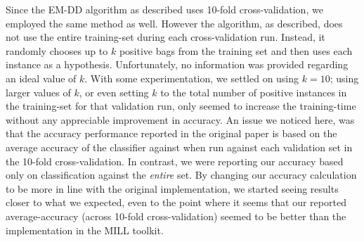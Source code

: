 \documentclass[conference]{IEEEtran}
\begin{document}
Since the EM-DD algorithm as described uses 10-fold cross-validation, we employed the same method as well. However the algorithm, as described, does not use the entire training-set during each cross-validation run. Instead, it randomly chooses up to $k$ positive bags from the training set and then uses each instance as a hypothesis. Unfortunately, no information was provided regarding an ideal value of $k$. With some experimentation, we settled on using $k = 10$; using larger values of $k$, or even setting $k$ to the total number of positive instances in the training-set for that validation run, only seemed to increase the training-time without any appreciable improvement in accuracy. An issue we noticed here, was that the accuracy performance reported in the original paper is based on the average accuracy of the classifier against when run against each validation set in the 10-fold cross-validation. In contrast, we were reporting our accuracy based only on classification against the \textit{entire} set. By changing our accuracy calculation to be more in line with the original implementation, we started seeing results closer to what we expected, even to the point where it seems that our reported average-accuracy (across 10-fold cross-validation) seemed to be better than the implementation in the MILL toolkit.
\end{document}
